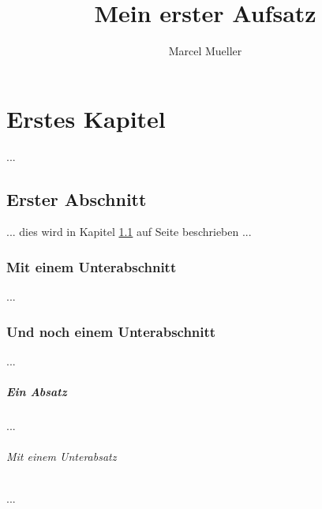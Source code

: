 \documentclass[12pt,a4paper,final]{scrbook}
\author{Marcel Mueller}
\title{Mein erster Aufsatz}
\begin{document}
\chapter{Erstes Kapitel}
...
\section{Erster Abschnitt}\label{sec:erster_abschnitt}
... 
dies wird in Kapitel \ref{sec:erster_abschnitt} 
auf Seite \pageref{sec:erster_abschnitt} beschrieben
...
\subsection{Mit einem Unterabschnitt}
...
\subsection{Und noch einem Unterabschnitt}
...
\paragraph{Ein Absatz}
...
\subparagraph{Mit einem Unterabsatz}
...
\end{document}
